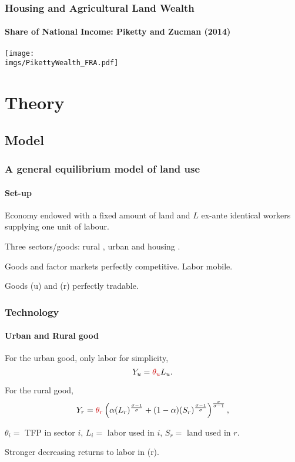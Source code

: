 \documentclass[aspectratio=169]{beamer}
\begin{document}
\begin{v75mins}
\begin{frame}
\frametitle{Housing and Agricultural Land Wealth}
\framesubtitle{Share of National Income: Piketty and Zucman (2014)}
	\begin{center}
		\texttt{[image: \\imgs/PikettyWealth\_FRA.pdf]}
	\end{center}
\end{frame}\end{v75mins}



\section{Theory}
\subsection{Model}
\begin{frame}
\frametitle{A general equilibrium model of land use}
\framesubtitle{Set-up}

\begin{midi}
\item Economy endowed with a fixed amount of land and $L$ ex-ante identical workers supplying one unit of labour.
\item Three sectors/goods: rural  , urban  and housing .
\item Goods and factor markets perfectly competitive. Labor mobile.
\item Goods (u) and (r) perfectly tradable.
\end{midi}
\end{frame}


\begin{frame}
\frametitle{Technology}
\framesubtitle{Urban and Rural good}
\begin{midi}
\item For the urban good, only labor for simplicity,
\begin{equation*}
Y_u=\re{\theta_u}L_u.
\end{equation*}
\item For the rural good,
\begin{equation*}
Y_r=\re{\theta_r}\left(\alpha (L_r)^{\frac{\sigma-1}{\sigma}} +(1-\alpha)(S_r)^{\frac{\sigma-1}{\sigma}} \right)^{\frac{\sigma}{\sigma-1}},
\end{equation*}
\item $\theta_i=$ TFP in sector $i$, $L_i=$ labor used in $i$, $S_r=$ land used in $r$.
\item {}
\item Stronger decreasing returns to labor in (r).
\end{midi}

\end{frame}
\end{document}
